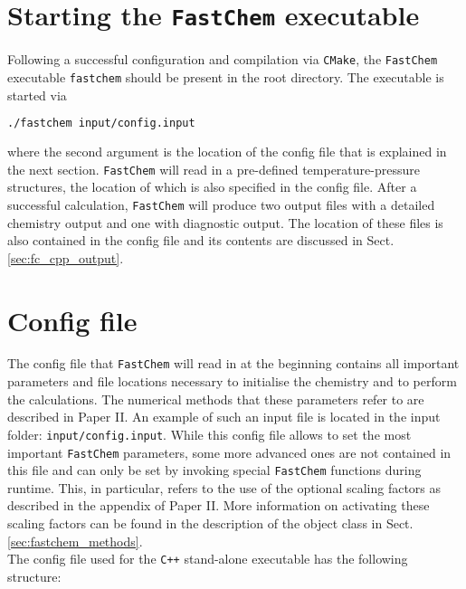 \documentclass[numbers=noenddot]{fcmanual}
\newcommand{\fc}{\texttt{FastChem}\xspace}
\newcommand{\cpp}{\ttt{C++}\xspace}
\newcommand{\ttt}[1]{\texttt {#1}}
\begin{document}
\section{Starting the \fc executable}

Following a successful configuration and compilation via \verb|CMake|, the \fc executable \verb|fastchem| should be present in the root directory. The executable is started via
\begin{lstlisting}[language=bash]
  ./fastchem input/config.input
\end{lstlisting}
where the second argument is the location of the config file that is explained in the next section. \fc will read in a pre-defined temperature-pressure structures, the location of which is also specified in the config file. After a successful calculation, \fc will produce two output files with a detailed chemistry output and one with diagnostic output. The location of these files is also contained in the config file and its contents are discussed in Sect. \ref{sec:fc_cpp_output}.


\section{Config file}

The config file that \fc will read in at the beginning contains all important parameters and file locations necessary to initialise the chemistry and to perform the calculations. The numerical methods that these parameters refer to are described in Paper II.
An example of such an input file is located in the input folder: \verb|input/config.input|. While this config file allows to set the most important \fc parameters, some more advanced ones are not contained in this file and can only be set by invoking special \fc functions during runtime. This, in particular, refers to the use of the optional scaling factors as described in the appendix of Paper II. More information on activating these scaling factors can be found in the description of the object class in Sect. \ref{sec:fastchem_methods}.\\

The config file used for the \cpp stand-alone executable has the following structure:

\end{document}
